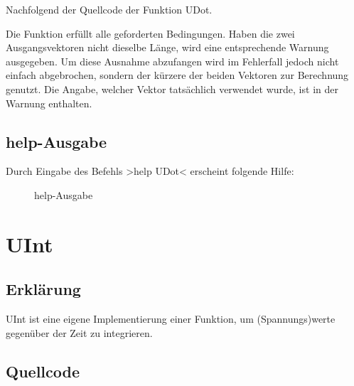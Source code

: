 \documentclass[%
  a4paper, %
  12pt, %
   article, %
  titlepage
]{scrartcl}
\begin{document}
\lstset{style=mystyle}

Nachfolgend der Quellcode der Funktion UDot.
 


\newpage

Die Funktion erfüllt alle geforderten Bedingungen. Haben die zwei Ausgangsvektoren nicht dieselbe Länge, wird eine entsprechende Warnung ausgegeben.
Um diese Ausnahme abzufangen wird im Fehlerfall jedoch nicht einfach abgebrochen, sondern der kürzere der beiden Vektoren zur Berechnung genutzt.
Die Angabe, welcher Vektor tatsächlich verwendet wurde, ist in der Warnung enthalten.

 \subsection{help-Ausgabe}

Durch Eingabe des Befehls >help UDot< erscheint folgende Hilfe:

\begin{figure}[h]
\caption{help-Ausgabe}
\label{fig1}
\end{figure}




  \section{UInt}
  \subsection{Erklärung}

UInt ist eine eigene Implementierung einer Funktion, um (Spannungs)werte gegenüber der Zeit zu integrieren.


\newpage

 \subsection{Quellcode}
\end{document}
